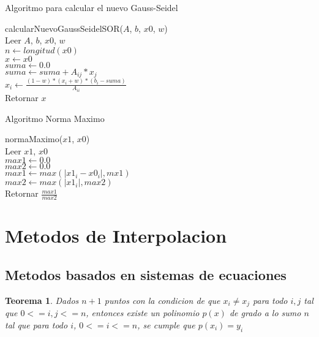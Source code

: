 \documentclass[12pt]{article}
\newtheorem{theorem}{Teorema}[section]
\begin{document}
        \begin{algorithm}[H]
            \caption{Algoritmo para calcular el nuevo Gauss-Seidel}
            calcularNuevoGaussSeidelSOR($A$, $b$, $x0$, $w$)\\
            Leer $A$, $b$, $x0$, $w$\\
            $n \leftarrow longitud(x0)$\\
            $x \leftarrow x0$\\
            {
                $suma \leftarrow 0.0$\\
                {
                    {
                        $suma \leftarrow suma + A_{ij} * x_j$\\
                    }
                }
                $x_i \leftarrow \frac{(1 - w) * (x_i + w) * (b_i - suma)}{A_{ii}}$\\
            }
            Retornar $x$\\
        \end{algorithm}

        \begin{algorithm}[H]
            \caption{Algoritmo Norma Maximo}
            normaMaximo($x1$, $x0$)\\
            Leer $x1$, $x0$\\
            $max1 \leftarrow 0.0$\\
            $max2 \leftarrow 0.0$\\
            {
                $max1 \leftarrow max(|x1_i - x0_i|, mx1)$\\
                $max2 \leftarrow max(|x1_i|, max2)$\\
            }
            Retornar $\frac{max1}{max2}$\\
        \end{algorithm}

        \section{Metodos de Interpolacion}

        \subsection{Metodos basados en sistemas de ecuaciones}
        \begin{theorem}
            Dados $n + 1$ puntos con la condicion de que $x_{i} \neq x_{j}$ para todo $i, j$ tal que $0 <= i, j <= n$, entonces existe un polinomio $p(x)$ de grado a lo sumo $n$ tal que para todo $i$, $0 <= i <= n$, se cumple que $p(x_{i}) = y_{i}$
        \end{theorem}
\end{document}
